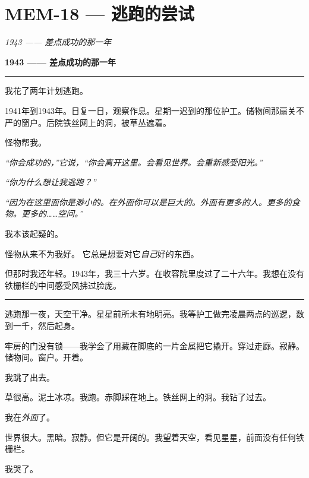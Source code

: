 \section*{\textbf{MEM-18} --- 逃跑的尝试}

\noindent \textit{1943 —— 差点成功的那一年}

\noindent \textbf{1943 —— 差点成功的那一年}

\vspace{0.5em}\noindent\rule{\textwidth}{0.5pt}\vspace{0.5em}

\noindent 我花了两年计划逃跑。

\noindent 1941年到1943年。日复一日，观察作息。星期一迟到的那位护工。储物间那扇关不严的窗户。后院铁丝网上的洞，被草丛遮着。

\noindent 怪物帮我。

\noindent \textit{“你会成功的，”它说，“你会离开这里。会看见世界。会重新感受阳光。”}

\noindent \textit{“你为什么想让我逃跑？”}

\noindent \textit{“因为在这里面你是渺小的。在外面你可以是巨大的。外面有更多的人。更多的食物。更多的……空间。”}

\noindent 我本该起疑的。

\noindent 怪物从来不为我好。
它总是想要对它\textit{自己}好的东西。

\noindent 但那时我还年轻。1943年，我三十六岁。在收容院里度过了二十六年。我想在没有铁栅栏的中间感受风拂过脸庞。

\vspace{0.5em}\noindent\rule{\textwidth}{0.5pt}\vspace{0.5em}

\noindent 逃跑那一夜，天空干净。星星前所未有地明亮。我等护工做完凌晨两点的巡逻，数到一千，然后起身。

\noindent 牢房的门没有锁——我学会了用藏在脚底的一片金属把它撬开。穿过走廊。寂静。储物间。窗户。开着。

\noindent 我跳了出去。

\noindent 草很高。泥土冰凉。我跑。赤脚踩在地上。铁丝网上的洞。我钻了过去。

\noindent 我在\textit{外面}了。

\noindent 世界很大。黑暗。寂静。但它是开阔的。我望着天空，看见星星，前面没有任何铁栅栏。

\noindent 我哭了。


